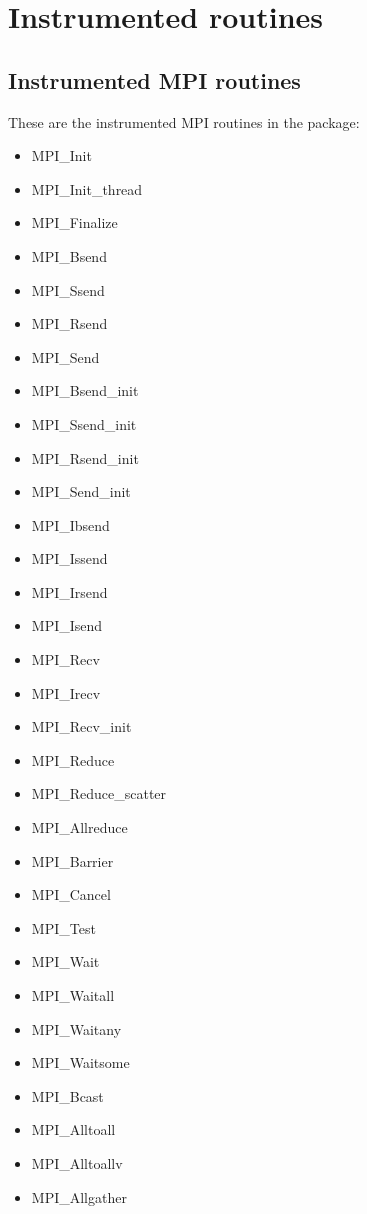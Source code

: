 \chapter{Instrumented routines}\label{cha:InstrumentedRoutines}

\section{Instrumented MPI routines}\label{sec:MPIinstrumentedroutines}

These are the instrumented MPI routines in the \TRACE package:

\begin{itemize}
\item MPI\_Init
\item MPI\_Init\_thread\footnotemark[1]
\item MPI\_Finalize
\item MPI\_Bsend
\item MPI\_Ssend
\item MPI\_Rsend
\item MPI\_Send
\item MPI\_Bsend\_init
\item MPI\_Ssend\_init
\item MPI\_Rsend\_init
\item MPI\_Send\_init
\item MPI\_Ibsend
\item MPI\_Issend
\item MPI\_Irsend
\item MPI\_Isend
\item MPI\_Recv
\item MPI\_Irecv
\item MPI\_Recv\_init
\item MPI\_Reduce
\item MPI\_Reduce\_scatter
\item MPI\_Allreduce
\item MPI\_Barrier
\item MPI\_Cancel
\item MPI\_Test
\item MPI\_Wait
\item MPI\_Waitall
\item MPI\_Waitany
\item MPI\_Waitsome
\item MPI\_Bcast
\item MPI\_Alltoall
\item MPI\_Alltoallv
\item MPI\_Allgather

\end{itemize}
